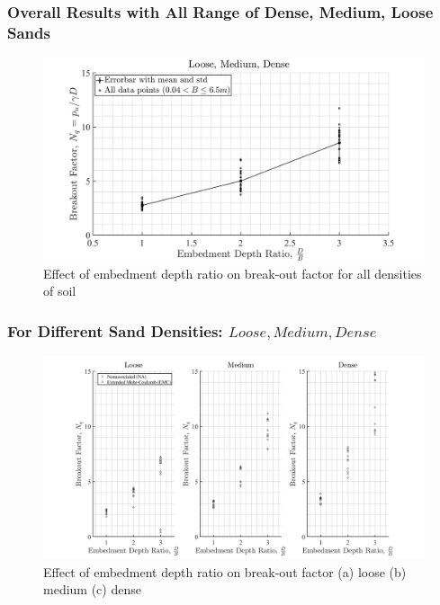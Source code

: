 \documentclass[a4paper, nobind]{templates/ociamthesis}
\begin{document}
\hypertarget{overall-results-with-all-range-of-dense-medium-loose-sands}{%
\subsubsection{Overall Results with All Range of Dense, Medium, Loose Sands}\label{overall-results-with-all-range-of-dense-medium-loose-sands}}

\begin{figure}[H]
\includegraphics[width=1\linewidth]{myfigureeeeee/errorplot} \caption{Effect of embedment depth ratio on break-out factor for all densities of soil}\label{fig:unnamed-chunk-21}
\end{figure}

\hypertarget{for-different-sand-densities-loose-medium-dense}{%
\subsubsection{\texorpdfstring{For Different Sand Densities: \(Loose, Medium, Dense\)}{For Different Sand Densities: Loose, Medium, Dense}}\label{for-different-sand-densities-loose-medium-dense}}

\begin{figure}[H]
\includegraphics[width=1\linewidth]{myfigureeeeee/loosemediumdense} \caption{Effect of embedment depth ratio on break-out factor (a) loose (b) medium (c) dense}\label{fig:unnamed-chunk-22}
\end{figure}
\end{document}
